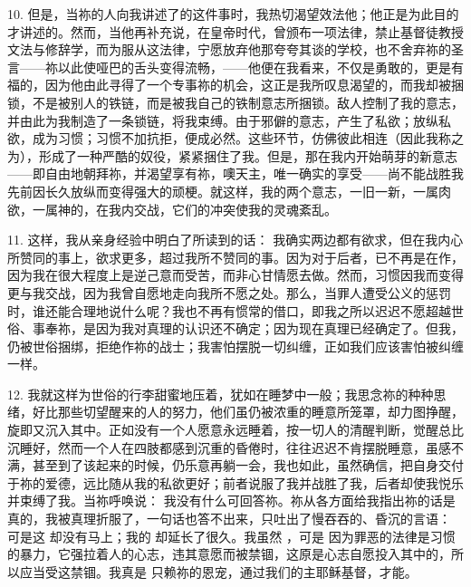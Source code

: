 10. 但是，当祢的人向我讲述了的这件事时，我热切渴望效法他；他正是为此目的才讲述的。然而，当他再补充说，在皇帝时代，曾颁布一项法律，禁止基督徒教授文法与修辞学，而为服从这法律，宁愿放弃他那夸夸其谈的学校，也不舍弃祢的圣言——祢以此使哑巴的舌头变得流畅，——他便在我看来，不仅是勇敢的，更是有福的，因为他由此寻得了一个专事祢的机会，这正是我所叹息渴望的，而我却被捆锁，不是被别人的铁链，而是被我自己的铁制意志所捆锁。敌人控制了我的意志，并由此为我制造了一条锁链，将我束缚。由于邪僻的意志，产生了私欲；放纵私欲，成为习惯；习惯不加抗拒，便成必然。这些环节，仿佛彼此相连（因此我称之为），形成了一种严酷的奴役，紧紧捆住了我。但是，那在我内开始萌芽的新意志——即自由地朝拜祢，并渴望享有祢，噢天主，唯一确实的享受——尚不能战胜我先前因长久放纵而变得强大的顽梗。就这样，我的两个意志，一旧一新，一属肉欲，一属神的，在我内交战，它们的冲突使我的灵魂紊乱。\par

11. 这样，我从亲身经验中明白了所读到的话： 我确实两边都有欲求，但在我内心所赞同的事上，欲求更多，超过我所不赞同的事。因为对于后者，已不再是在作，因为我在很大程度上是逆己意而受苦，而非心甘情愿去做。然而，习惯因我而变得更与我交战，因为我曾自愿地走向我所不愿之处。那么，当罪人遭受公义的惩罚时，谁还能合理地说什么呢？我也不再有惯常的借口，即我之所以迟迟不愿超越世俗、事奉祢，是因为我对真理的认识还不确定；因为现在真理已经确定了。但我，仍被世俗捆绑，拒绝作祢的战士；我害怕摆脱一切纠缠，正如我们应该害怕被纠缠一样。\par

12. 我就这样为世俗的行李甜蜜地压着，犹如在睡梦中一般；我思念祢的种种思绪，好比那些切望醒来的人的努力，他们虽仍被浓重的睡意所笼罩，却力图挣醒，旋即又沉入其中。正如没有一个人愿意永远睡着，按一切人的清醒判断，觉醒总比沉睡好，然而一个人在四肢都感到沉重的昏倦时，往往迟迟不肯摆脱睡意，虽感不满，甚至到了该起来的时候，仍乐意再躺一会，我也如此，虽然确信，把自身交付于祢的爱德，远比随从我的私欲更好；前者说服了我并战胜了我，后者却使我悦乐并束缚了我。当祢呼唤说： 我没有什么可回答祢。祢从各方面给我指出祢的话是真的，我被真理折服了，一句话也答不出来，只吐出了慢吞吞的、昏沉的言语： 可是这  却没有马上；我的  却延长了很久。我虽然 ，可是   因为罪恶的法律是习惯的暴力，它强拉着人的心志，违其意愿而被禁锢，这原是心志自愿投入其中的，所以应当受这禁锢。我真是  只赖祢的恩宠，通过我们的主耶稣基督，才能。\par

